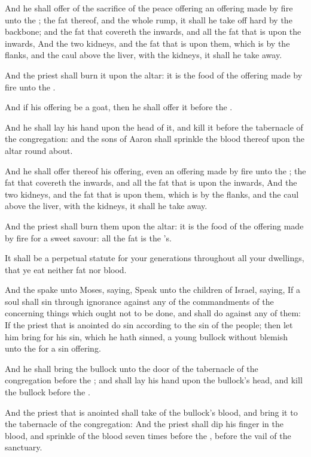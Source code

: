 \Verse And he shall offer of the sacrifice of the peace offering an offering made by fire unto the \LORD; the fat thereof, and the whole rump, it shall he take off hard by the backbone; and the fat that covereth the inwards, and all the fat that is upon the inwards, \Verse And the two kidneys, and the fat that is upon them, which is by the flanks, and the caul above the liver, with the kidneys, it shall he take away.

\Verse And the priest shall burn it upon the altar: it is the food of the offering made by fire unto the \LORD.

\Verse And if his offering be a goat, then he shall offer it before the \LORD.

\Verse And he shall lay his hand upon the head of it, and kill it before the tabernacle of the congregation: and the sons of Aaron shall sprinkle the blood thereof upon the altar round about.

\Verse And he shall offer thereof his offering, even an offering made by fire unto the \LORD; the fat that covereth the inwards, and all the fat that is upon the inwards, \Verse And the two kidneys, and the fat that is upon them, which is by the flanks, and the caul above the liver, with the kidneys, it shall he take away.

\Verse And the priest shall burn them upon the altar: it is the food of the offering made by fire for a sweet savour: all the fat is the \LORD's.

\Verse It shall be a perpetual statute for your generations throughout all your dwellings, that ye eat neither fat nor blood.

\Chapter
\Verse And the \LORD spake unto Moses, saying, \Verse Speak unto the children of Israel, saying, If a soul shall sin through ignorance against any of the commandments of the \LORD concerning things which ought not to be done, and shall do against any of them: \Verse If the priest that is anointed do sin according to the sin of the people; then let him bring for his sin, which he hath sinned, a young bullock without blemish unto the \LORD for a sin offering.

\Verse And he shall bring the bullock unto the door of the tabernacle of the congregation before the \LORD; and shall lay his hand upon the bullock's head, and kill the bullock before the \LORD.

\Verse And the priest that is anointed shall take of the bullock's blood, and bring it to the tabernacle of the congregation: \Verse And the priest shall dip his finger in the blood, and sprinkle of the blood seven times before the \LORD, before the vail of the sanctuary.

